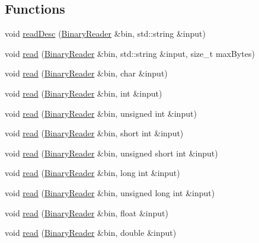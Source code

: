 \subsection*{Functions}
\begin{DoxyCompactItemize}
\item 
void \mbox{\hyperlink{namespaceADATIO_af57306a140489d28cd8fa1107d585906}{read\+Desc}} (\mbox{\hyperlink{classADATIO_1_1BinaryReader}{Binary\+Reader}} \&bin, std\+::string \&input)
\item 
void \mbox{\hyperlink{namespaceADATIO_ab1b78a1922de3cc047517ead7aa99825}{read}} (\mbox{\hyperlink{classADATIO_1_1BinaryReader}{Binary\+Reader}} \&bin, std\+::string \&input, size\+\_\+t max\+Bytes)
\item 
void \mbox{\hyperlink{namespaceADATIO_a32f382a05f4fc1a3d423363f7964ae1f}{read}} (\mbox{\hyperlink{classADATIO_1_1BinaryReader}{Binary\+Reader}} \&bin, char \&input)
\item 
void \mbox{\hyperlink{namespaceADATIO_ad09ed9f17d6e412ab867031ad3b9e117}{read}} (\mbox{\hyperlink{classADATIO_1_1BinaryReader}{Binary\+Reader}} \&bin, int \&input)
\item 
void \mbox{\hyperlink{namespaceADATIO_ab12f044844bc44c732b1d6f903fb16ad}{read}} (\mbox{\hyperlink{classADATIO_1_1BinaryReader}{Binary\+Reader}} \&bin, unsigned int \&input)
\item 
void \mbox{\hyperlink{namespaceADATIO_a84cdbbeb07150af08ce2313df0237728}{read}} (\mbox{\hyperlink{classADATIO_1_1BinaryReader}{Binary\+Reader}} \&bin, short int \&input)
\item 
void \mbox{\hyperlink{namespaceADATIO_a59ee5c8cc7ec8551d39dc0b947a780a5}{read}} (\mbox{\hyperlink{classADATIO_1_1BinaryReader}{Binary\+Reader}} \&bin, unsigned short int \&input)
\item 
void \mbox{\hyperlink{namespaceADATIO_a68d168b17cfa4dee83df2c6039d569ca}{read}} (\mbox{\hyperlink{classADATIO_1_1BinaryReader}{Binary\+Reader}} \&bin, long int \&input)
\item 
void \mbox{\hyperlink{namespaceADATIO_a02ebdefcf436220fd6967af8391de2d6}{read}} (\mbox{\hyperlink{classADATIO_1_1BinaryReader}{Binary\+Reader}} \&bin, unsigned long int \&input)
\item 
void \mbox{\hyperlink{namespaceADATIO_a66f06451ef1705309458a4e2adc71a28}{read}} (\mbox{\hyperlink{classADATIO_1_1BinaryReader}{Binary\+Reader}} \&bin, float \&input)
\item 
void \mbox{\hyperlink{namespaceADATIO_a285f2a260e51c5e11c51e339779378a3}{read}} (\mbox{\hyperlink{classADATIO_1_1BinaryReader}{Binary\+Reader}} \&bin, double \&input)

\end{DoxyCompactItemize}
